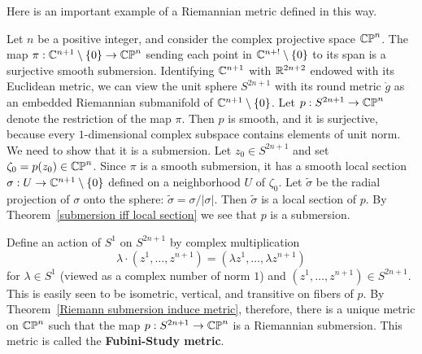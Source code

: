 Here is an important example of a Riemannian metric defined in this way.
\begin{example}
Let $n$ be a positive integer, and consider the complex projective space $\mathbb{CP}^n$. The 
map $\pi:\mathbb{C}^{n+1}\setminus\{0\}\to\mathbb{CP}^n$ sending each point in $\mathbb{C}^{n+!}\setminus\{0\}$ 
to its span is a surjective smooth submersion. Identifying $\mathbb{C}^{n+1}$ with $\mathbb{R}^{2n+2}$ 
endowed with its Euclidean metric, we can view the unit sphere $S^{2n+1}$ with 
its round metric $\mathring{g}$ as an embedded Riemannian submanifold of $\mathbb{C}^{n+1}\setminus\{0\}$. 
Let $p:S^{2n+1}\to\mathbb{CP}^n$ denote the restriction of the map $\pi$. Then $p$ is 
smooth, and it is surjective, because every $1$-dimensional complex subspace 
contains elements of unit norm. We need to show that it is a submersion. Let $z_0\in S^{2n+1}$ 
and set  $\zeta_0=p(z_0)\in\mathbb{CP}^n$. Since $\pi$ is a smooth submersion, it has a 
smooth local section $\sigma:U\to\mathbb{C}^{n+1}\setminus\{0\}$ defined on a neighborhood 
$U$ of $\zeta_0$. Let $\widetilde{\sigma}$ be the radial projection of $\sigma$ 
onto the sphere: $\widetilde{\sigma}=\sigma/|\sigma|$. Then $\widetilde{\sigma}$ is a 
local section of $p$. By Theorem~\ref{submersion iff local section} we see that $p$ 
is a submersion.\par
Define an action of $S^1$ on $S^{2n+1}$ by complex multiplication
\[\lambda\cdot(z^1,\dots,z^{n+1})=(\lambda z^1,\dots,\lambda z^{n+1})\]
for $\lambda\in S^1$ (viewed as a complex number of norm $1$) and $(z^1,\dots,z^{n+1})\in S^{2n+1}$. 
This is easily seen to be isometric, vertical, and transitive on fibers of $p$. By 
Theorem~\ref{Riemann submersion induce metric}, therefore, there is a unique 
metric on $\mathbb{CP}^n$ such that the map $p:S^{2n+1}\to\mathbb{CP}^n$ is a Riemannian submersion. 
This metric is called the \textbf{Fubini-Study metric}.
\end{example}
